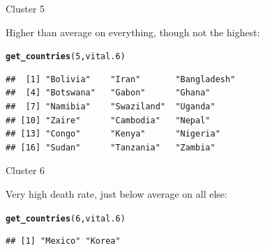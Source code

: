 \documentclass[unknownkeysallowed]{beamer}\usepackage[]{graphicx}\usepackage[]{color}
\makeatletter
\newcommand{\hlnum}[1]{\textcolor[rgb]{0.686,0.059,0.569}{#1}}%
\newcommand{\hlstd}[1]{\textcolor[rgb]{0.345,0.345,0.345}{#1}}%
\newcommand{\hlkwd}[1]{\textcolor[rgb]{0.737,0.353,0.396}{\textbf{#1}}}%
\newenvironment{kframe}{%
 \def\at@end@of@kframe{}%
 \ifinner\ifhmode%
  \def\at@end@of@kframe{\end{minipage}}%
  \begin{minipage}{\columnwidth}%
 \fi\fi%
 \def\FrameCommand##1{\hskip\@totalleftmargin \hskip-\fboxsep
 \colorbox{shadecolor}{##1}\hskip-\fboxsep
     \hskip-\linewidth \hskip-\@totalleftmargin \hskip\columnwidth}%
 \MakeFramed {\advance\hsize-\width
   \@totalleftmargin\z@ \linewidth\hsize
   \@setminipage}}%
 {\par\unskip\endMakeFramed%
 \at@end@of@kframe}
\newenvironment{knitrout}{}{} %
\makeatother
\begin{document}
\begin{frame}[fragile]{Cluster 5}

  Higher than average on everything, though not the highest:
  
\begin{knitrout}
\color{fgcolor}\begin{kframe}
\begin{alltt}
\hlkwd{get_countries}\hlstd{(}\hlnum{5}\hlstd{,vital.6)}
\end{alltt}
\begin{verbatim}
##  [1] "Bolivia"    "Iran"       "Bangladesh"
##  [4] "Botswana"   "Gabon"      "Ghana"     
##  [7] "Namibia"    "Swaziland"  "Uganda"    
## [10] "Zaire"      "Cambodia"   "Nepal"     
## [13] "Congo"      "Kenya"      "Nigeria"   
## [16] "Sudan"      "Tanzania"   "Zambia"
\end{verbatim}
\end{kframe}
\end{knitrout}
  
\end{frame}
\begin{frame}[fragile]{Cluster 6}

    Very high death rate, just below average on all else:

  
\begin{knitrout}
\color{fgcolor}\begin{kframe}
\begin{alltt}
\hlkwd{get_countries}\hlstd{(}\hlnum{6}\hlstd{,vital.6)}
\end{alltt}
\begin{verbatim}
## [1] "Mexico" "Korea"
\end{verbatim}
\end{kframe}
\end{knitrout}
  
\end{frame}
\end{document}
